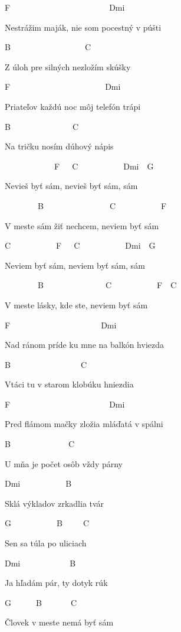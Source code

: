 
F~~~~~~~~~~~~~~~~~~~~~~~~Dmi

Nestrážim maják, nie som pocestný v púšti

B~~~~~~~~~~~~~~~~~~C

Z úloh pre silných nezložím skúšky

F~~~~~~~~~~~~~~~~~~~~~~~Dmi

Priateľov každú noc môj telefón trápi

B~~~~~~~~~~~~~~~C

Na tričku nosím dúhový nápis

\bigskip
\begin{chorustext}
~~~~~~~~~~~~F~~~C~~~~~~~~~~~Dmi~~G

Nevieš byť sám, nevieš byť sám, sám

~~~~~~~~B~~~~~~~~~~~~~~~~C~~~~~~~~~~~F

V meste sám žiť nechcem, neviem byť sám

C~~~~~~~~~~~F~~~C~~~~~~~~~~~Dmi~~G

Neviem byť sám, neviem byť sám, sám

~~~~~~~~B~~~~~~~~~~~~~~~C~~~~~~~~~~~F~~C

V meste lásky, kde ste, neviem byť sám
\end{chorustext}

\bigskip

F~~~~~~~~~~~~~~~~~~~~~~Dmi

Nad ránom príde ku mne na balkón hviezda

B~~~~~~~~~~~~~~~~~C

Vtáci tu v starom klobúku hniezdia

F~~~~~~~~~~~~~~~~~~~~~~~~Dmi

Pred flámom mačky zložia mláďatá v spálni

B~~~~~~~~~~~~~~C

U mňa je počet osôb vždy párny 

\bigskip
\chorus
\bigskip

Dmi~~~~~~~~~~~B

Sklá výkladov zrkadlia tvár

G~~~~~~~~~~~B~~~~~C

Sen sa túla po uliciach

Dmi~~~~~~~~~~~~B

Ja hľadám pár, ty dotyk rúk

G~~~~~~B~~~~~~~C

Človek v meste nemá byť sám

\bigskip

